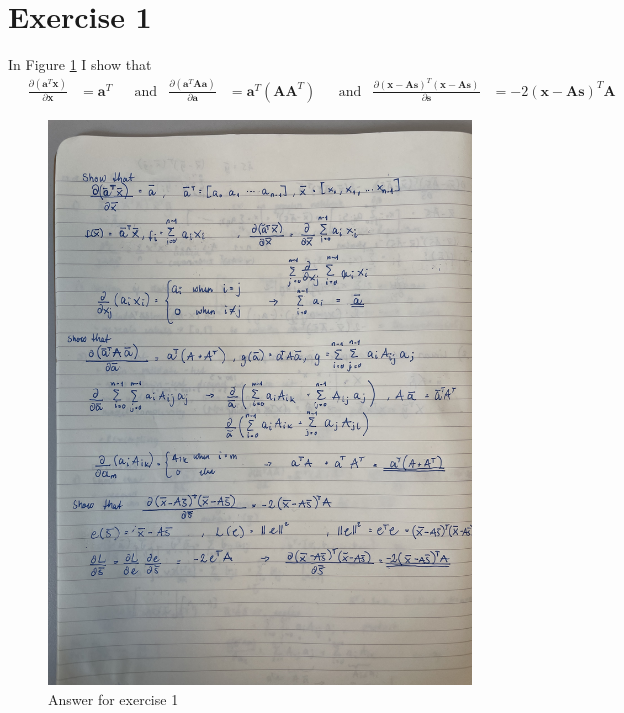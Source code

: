 \section{Exercise 1}\label{sec:ex1}
In Figure \ref{fig:ex1} I show that 
\begin{align*}
    \quad \frac{\partial (\mathbf{a}^{T}\mathbf{x})}{\partial \mathbf{x}} &= \mathbf{a}^{T} && \text{and} & \frac{\partial (\mathbf{a}^{T} \mathbf{A} \mathbf{a})}{\partial \mathbf{a}} &= \mathbf{a}^{T} (\mathbf{A} \mathbf{A}^{T}) && \text{and} & \frac{\partial (\mathbf{x} - \mathbf{A} \mathbf{s})^{T} (\mathbf{x} - \mathbf{A} \mathbf{s})}{\partial \mathbf{s}} &= -2 (\mathbf{x} - \mathbf{A} \mathbf{s})^{T} \mathbf{A}
\end{align*}

\begin{figure}
    \centering
    \includegraphics[width=0.8\linewidth, angle=270]{latex/figures/ex35-1.jpeg}
    \caption{Answer for exercise 1}
    \label{fig:ex1}
\end{figure}

